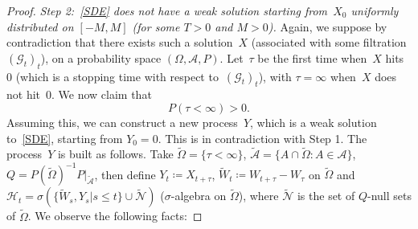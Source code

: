 \documentclass[a4paper,10pt]{article}
\newcommand\1{\mathbbm{1}}
\newcommand{\mc}{\mathcal}
\newcommand{\td}{\tilde}
\numberwithin{equation}{section}
\begin{document}
\begin{proof}
\emph{Step 2:~\eqref{SDE} does not have a weak solution starting from~$X_0$ uniformly distributed on $[-M,M]$ \textup{(}for some $T>0$ and $M>0$\textup{)}.} Again, we suppose by contradiction that there exists such a solution~$X$ (associated with some filtration $(\mc{G}_t)_t$), on a probability space $(\Omega,\mc{A},P)$. Let~$\tau$ be the first time when~$X$ hits~$0$ (which is a stopping time with respect to~$(\mc{G}_t)_t$), with $\tau=\infty$ when~$X$ does not hit~$0$. We now claim that
\begin{equation}
P(\tau<\infty)>0 .\label{claim'}
\end{equation}
Assuming this, we can construct a new process~$Y$, which is a weak solution to~\eqref{SDE}, starting from $Y_0=0$. This is in contradiction with Step 1. The process~$Y$ is built as follows. Take $\td{\Omega}=\{\tau<\infty\}$, $\td{\mc{A}}=\{A\cap\td{\Omega} \colon A\in\mc{A}\}$, $Q= P(\td{\Omega})^{-1} P|_{\td{\mc{A}}}$, then define $Y_t \coloneqq X_{t+\tau}$, $\td{W}_t \coloneqq W_{t+\tau}-W_\tau$ on $\td{\Omega}$ and $\mc{H}_t=\sigma(\{\td{W}_s,Y_s|s\le t\}\cup\tilde{\mathcal{N}})$ ($\sigma$-algebra on $\td{\Omega}$), where $\tilde{\mathcal{N}}$ is the set of $Q$-null sets of $\tilde{\Omega}$. We observe the following facts:


\end{proof}
\end{document}

